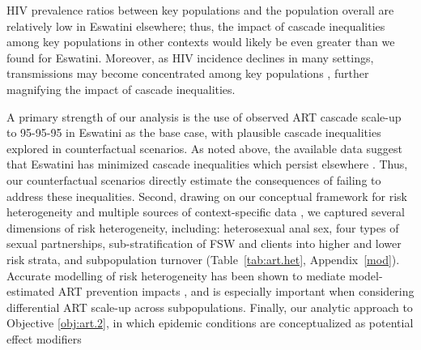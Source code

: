 HIV prevalence ratios between key populations and the population overall
are relatively low in Eswatini \vs elsewhere;
thus, the impact of cascade inequalities among key populations in other contexts
would likely be even greater than we found for Eswatini.
Moreover, as HIV incidence declines in many settings,
transmissions may become concentrated among key populations \cite{Brown2019},
further magnifying the impact of cascade inequalities.
\par
A primary strength of our analysis is the use of
observed ART cascade scale-up to 95-95-95 in Eswatini as the base case,
with plausible cascade inequalities explored in counterfactual scenarios.
As noted above, the available data suggest that Eswatini has
minimized cascade inequalities which persist elsewhere \cite{Hakim2018}.
Thus, our counterfactual scenarios directly estimate
the consequences of failing to address these inequalities.
Second, drawing on our conceptual framework for risk heterogeneity \cite[Table~1]{Knight2022sr}
and multiple sources of context-specific data
\cite{SDHS2006,SHIMS1,SHIMS2,Baral2014,EswKP2014,EswIBBS2022},
we captured several dimensions of risk heterogeneity, including:
heterosexual anal sex,
four types of sexual partnerships,
sub-stratification of FSW and clients into higher and lower risk strata,
and subpopulation turnover
(Table~\ref{tab:art.het}, Appendix~\ref{mod}).
Accurate modelling of risk heterogeneity
has been shown to mediate model-estimated ART prevention impacts \cite{Hontelez2013},
and is especially important when considering differential ART scale-up across subpopulations.
Finally, our analytic approach to Objective \ref{obj:art.2},
in which epidemic conditions are conceptualized as potential effect modifiers
